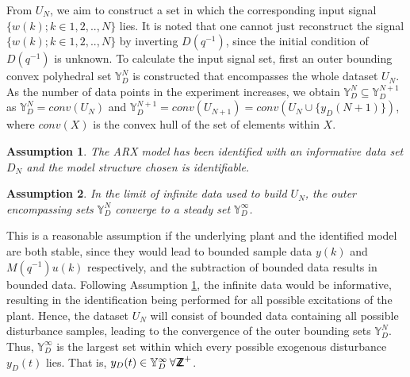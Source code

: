 \documentclass[letterpaper, 10 pt, conference]{ieeeconf}  %
\newcommand*{\ZZ}{%
	\textsf{Z\kern-1ex Z}%
}
\newtheorem{assumption}{Assumption}
\begin{document}
    From $U_N$, we aim to construct a set in which the corresponding input signal $\{w(k);k \in 1,2,..,N\}$ lies. It is noted that one cannot just reconstruct the signal $\{w(k);k \in 1,2,..,N\}$ by inverting $D(q^{-1})$, since the initial condition of $D(q^{-1})$ is unknown.
    To calculate the input signal set,
 first an outer bounding convex polyhedral set $\mathbb{Y}_D^N$ is constructed that encompasses the whole dataset $U_N$. As the number of data points in the experiment increases, we obtain $\mathbb{Y}_D^{N} \subseteq \mathbb{Y}_D^{N+1}$ as
 $\mathbb{Y}_D^{N} = conv(U_N)$ and  $\mathbb{Y}_D^{N+1} = conv(U_{N+1})=conv(U_{N} \cup \{y_D(N+1)\} )$, where $conv(X)$ is the convex hull of the set of elements within $X$. 
  \begin{assumption}
  	The ARX model has been identified with an informative data set $D_N$ and the model structure chosen is identifiable.
  	\label{assmp_arx}
  \end{assumption} 
 \begin{assumption}
 	 In the limit of infinite data used to build $U_N$, the outer encompassing sets $\mathbb{Y}_D^{N}$ converge to a steady set $\mathbb{Y}_D^{\infty}$.
 	 \label{assmp_inf}
 \end{assumption} 
  This is a reasonable assumption if the underlying plant and the identified model are both stable, since they would lead to bounded sample data $y(k)$ and $M(q^{-1})u(k)$ respectively, and the subtraction of bounded data results in bounded data. Following Assumption \ref{assmp_arx}, the infinite data would be informative, resulting in the identification being performed for all possible excitations of the plant. Hence, the dataset $U_N$ will consist of bounded data containing all possible disturbance samples, leading to the convergence of the outer bounding sets $\mathbb{Y}_D^N$. Thus, $\mathbb{Y}_D^{\infty}$ is the largest set within which every possible exogenous disturbance $y_D(t)$ lies. That is, $y_D(t) \in \mathbb{Y}_D^{\infty} \hspace{2pt}  \forall \ZZ^{+}$.
\end{document}
